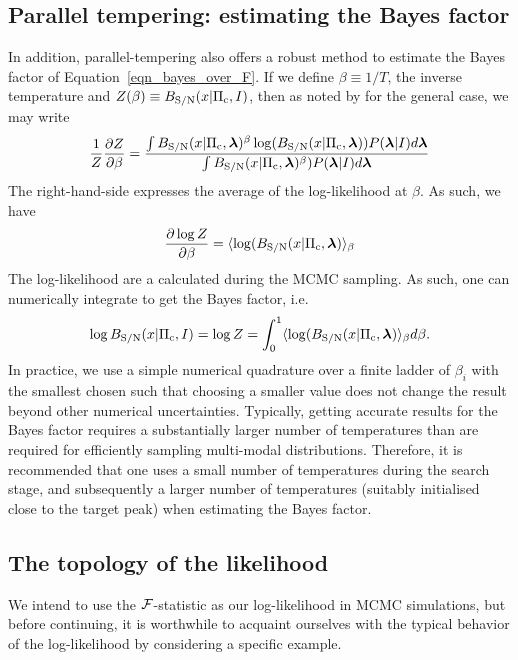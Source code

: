 \documentclass[aps, prd, twocolumn, superscriptaddress, floatfix, showpacs, nofootinbib, longbibliography]{revtex4-1}
\begin{document}
\subsection{Parallel tempering: estimating the Bayes factor}
In addition, parallel-tempering also offers a robust method to estimate the
Bayes factor of Equation~\eqref{eqn_bayes_over_F}. If we define
$\beta\equiv1/T$, the inverse temperature and $Z(\beta)\equiv B_{\rm S/N}(x| \Pi_{\rm
c}, I)$, then as noted by \citet{goggans2004} for the general case, we may
write
\begin{align}
\frac{1}{Z} \frac{\partial Z}{\partial \beta}=
\frac{
\int B_{\rm S/N}(x| \Pi_{\rm c}, \boldsymbol{\mathbf{\lambda}})^{\beta}
\log(B_{\rm S/N}(x| \Pi_{\rm c}, \boldsymbol{\mathbf{\lambda}}))P(\boldsymbol{\mathbf{\lambda}}| I)
d\boldsymbol{\mathbf{\lambda}}
}
{
\int B_{\rm S/N}(x| \Pi_{\rm c}, \boldsymbol{\mathbf{\lambda}})^{\beta})P(\boldsymbol{\mathbf{\lambda}}| I)
d\boldsymbol{\mathbf{\lambda}}
}
\end{align}
The right-hand-side expresses the average of the log-likelihood at $\beta$. As
such, we have
\begin{align}
\frac{\partial \log Z}{\partial \beta} = 
\langle \log(B_{\rm S/N}(x| \Pi_{\rm c}, \boldsymbol{\mathbf{\lambda}}) \rangle_{\beta}
\end{align}
The log-likelihood are a calculated during the MCMC sampling. As such, one
can numerically integrate to get the Bayes factor, i.e.
\begin{align}
\log B_{\rm S/N}(x| \Pi_{\rm c}, I) = \log Z = \int_{0}^{1}
\langle \log(B_{\rm S/N}(x| \Pi_{\rm c}, \boldsymbol{\mathbf{\lambda}}) \rangle_{\beta} d\beta.
\end{align}
In practice, we use a simple numerical quadrature over a finite ladder of
$\beta_i$ with the smallest chosen such that choosing a smaller value does not
change the result beyond other numerical uncertainties. Typically, getting
accurate results for the Bayes factor requires a substantially larger number of
temperatures than are required for efficiently sampling multi-modal
distributions.  Therefore, it is recommended that one uses a small number of
temperatures during the search stage, and subsequently a larger number of
temperatures (suitably initialised close to the target peak) when estimating
the Bayes factor.

\subsection{The topology of the likelihood}

We intend to use the ${\mathcal{F}}$-statistic as our log-likelihood in MCMC simulations,
but before continuing, it is worthwhile to acquaint ourselves with the typical
behavior of the log-likelihood by considering a specific example.
\end{document}
